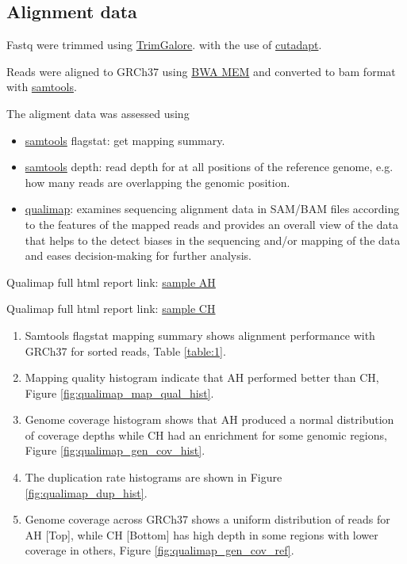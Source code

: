 \documentclass{article}
\begin{document}
\clearpage

\subsection{Alignment data}
\label{align_data}
Fastq were trimmed using
\href{https://www.bioinformatics.babraham.ac.uk/projects/trim_galore/}{TrimGalore}.  
with the use of 
\href{ https://github.com/marcelm/cutadapt/}{cutadapt}.

Reads were aligned to GRCh37 using 
\href{http://bio-bwa.sourceforge.net}{BWA MEM} and converted to bam format with 
\href{http://www.htslib.org}{samtools}.

The aligment data was assessed using 
\begin{itemize}
\item \href{http://www.htslib.org}{samtools} flagstat: get mapping summary.
\item \href{http://www.htslib.org}{samtools} depth: read depth for at all positions of the reference genome, e.g. how many reads are overlapping the genomic position.
\item \href{http://qualimap.conesalab.org}{qualimap}: examines sequencing alignment data in SAM/BAM files according to the features of the mapped reads and provides an overall view of the data that helps to the detect biases in the sequencing and/or mapping of the data and eases decision-making for further analysis.
\end{itemize}

Qualimap full html report link:
\href{https://lawlessgenomics.com/pages/sophia/AH_S1_L001.sort_stats/qualimapReport.html}{sample AH}

Qualimap full html report link:
\href{https://lawlessgenomics.com/pages/sophia/CH_S2_L001.sort_stats/qualimapReport.html}{sample CH}

\begin{enumerate}
\item Samtools flagstat mapping summary shows alignment performance with GRCh37 for sorted reads, Table \ref{table:1}.\\
\item Mapping quality histogram indicate that AH performed better than CH, Figure \ref{fig:qualimap_map_qual_hist}.
\item Genome coverage histogram shows that AH produced a normal distribution of coverage depths while CH had an enrichment for some genomic regions, Figure \ref{fig:qualimap_gen_cov_hist}.
\item The duplication rate histograms are shown in Figure \ref{fig:qualimap_dup_hist}.
\item Genome coverage across GRCh37 shows a uniform distribution of reads for AH [Top], while CH [Bottom] has high depth in some regions with lower coverage in others, Figure \ref{fig:qualimap_gen_cov_ref}.
\end{enumerate}
\end{document}

